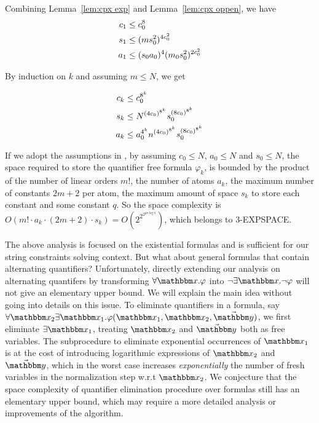 Combining Lemma~\ref{lem:cpx exp} and Lemma~\ref{lem:cpx oppen}, we have
\begin{align}
    c_1&\le c_0^8 \notag \\
    s_1&\le (ms_0^2)^{4c_0^2} \notag\\
    a_1&\le (s_0a_0)^4(m_0s_0^2)^{2c_0^2}\notag 
\end{align} 

By induction on $k$ and assuming $m\le N$, we get

\begin{lemma}
    \begin{align}
        c_k&\le c_0^{8^k} \notag \\
        s_k&\le N^{(4c_0)^{ 8^k}} s_0^{(8c_0)^{ 8^k}} \notag\\
        a_k&\le a_0^{4^k}n^{(4c_0)^{ 8^k}} s_0^{(8c_0)^{ 8^k}} \notag
    \end{align} 
\end{lemma}

If we adopt the assumptions in \cite{Oppen73}, by assuming $c_0\le N$, $a_0\le N$ and $s_0\le N$, the space required to store the quantifier free formula $\varphi_k$, is bounded by the product of the number of linear orders $m!$, the number of atoms $a_k$, the maximum number of constants $2m+2$ per atom, the maximum amount of space $s_k$ to store each constant and some constant $q$. So the space complexity is $O(m! \cdot a_k \cdot (2m+2) \cdot s_k)=O(2^{2^{2^{pn \log n}}})$, which belongs to 3-EXPSPACE.
 

The above analysis is focused on the existential {\paexp} formulas and is sufficient for our string constraints solving context. But what about general {\paexp} formulas that contain alternating quantifiers? Unfortunately, directly extending our analysis on alternating quantifers by transforming $\forall \ivarx.\varphi$ into $\neg \exists \ivarx.\neg \varphi$ will not give an elementary upper bound. We will explain the main idea without going into details on this issue. To eliminate quantifiers in a formula, say $\forall \ivarx_2\exists \ivarx_1.\varphi(\ivarx_1,\ivarx_2,\vec \ivary)$, we first eliminate $\exists \ivarx_1$, treating $\ivarx_2$ and $\vec \ivary$ both as free variables. The subprocedure to eliminate exponential occurrences of $\ivarx_1$ is at the cost of introducing logarithmic expressions of $\ivarx_2$ and $\vec \ivary$, which in the worst case increases \emph{exponentially} the number of fresh variables in the normalization step w.r.t $\ivarx_2$. We conjecture that the space complexity of quantifier elimination procedure over {\paexp} formulas still has an elementary upper bound, which may require a more detailed analysis or improvements of the algorithm.
